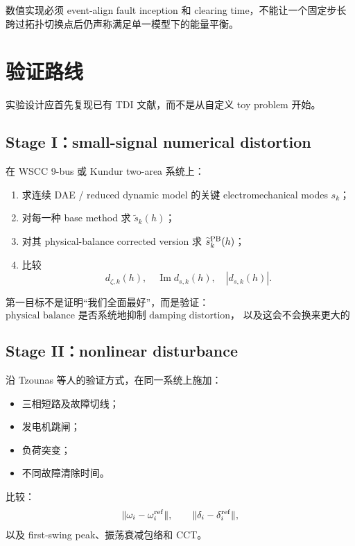 \documentclass[UTF8,11pt,a4paper]{ctexart}
\begin{document}
数值实现必须 event-align fault inception 和 clearing time，不能让一个固定步长
跨过拓扑切换点后仍声称满足单一模型下的能量平衡。

\section{验证路线}

实验设计应首先复现已有 TDI 文献，而不是从自定义 toy problem 开始。

\subsection{Stage I：small-signal numerical distortion}

在 WSCC 9-bus 或 Kundur two-area 系统上：
\begin{enumerate}[label=(\arabic*)]
  \item 求连续 DAE / reduced dynamic model 的关键 electromechanical modes \(s_k\)；
  \item 对每一种 base method 求 \(\widetilde s_k(h)\)；
  \item 对其 physical-balance corrected version 求
  \(\widetilde s_k^{\rm PB}(h)\)；
  \item 比较
  \[
    d_{\zeta,k}(h),\quad
    \operatorname{Im}d_{s,k}(h),\quad
    |d_{s,k}(h)|.
  \]
\end{enumerate}

第一目标不是证明“我们全面最好”，而是验证：
\[
  \boxed{
  \text{physical balance 是否系统地抑制 damping distortion，
  以及这会不会换来更大的 frequency distortion。}}
\]

\subsection{Stage II：nonlinear disturbance}

沿 Tzounas 等人的验证方式，在同一系统上施加：
\begin{itemize}
  \item 三相短路及故障切线；
  \item 发电机跳闸；
  \item 负荷突变；
  \item 不同故障清除时间。
\end{itemize}
比较：
\begin{equation}
  \|\omega_i-\omega_i^{\rm ref}\|,
  \qquad
  \|\delta_i-\delta_i^{\rm ref}\|,
\end{equation}
以及 first-swing peak、振荡衰减包络和 CCT。
\end{document}
